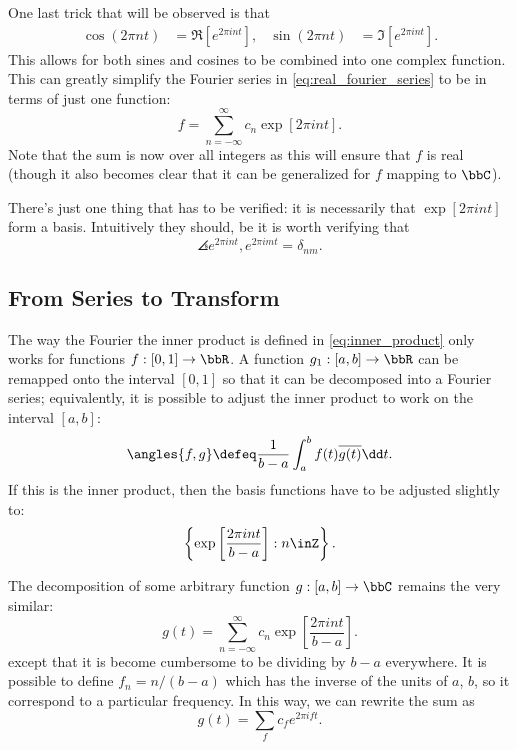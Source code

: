 \documentclass[
  a4paper,             %
  11pt,                %
  oneside,             %
  onecolumn,           %
  bibliography=totoc,  %
  final,               %
]{scrartcl}
\begin{document}
One last trick that will be observed is that
\begin{align}
  \cos(2\pi n t) &= \Re[e^{2\pi i n t}], &
  \sin(2\pi n t) &= \Im[e^{2\pi i n t}].
\end{align}
This allows for both sines and cosines to be combined into one complex function.
This can greatly simplify the Fourier series in \cref{eq:real_fourier_series}
to be in terms of just one function:
\begin{equation}
  \label{eq:complex_fourier_series}
  f = \sum_{n=-\infty}^{\infty} c_{n} \exp[2\pi i n t].
\end{equation}
Note that the sum is now over all integers as this will ensure that \(f\) is
real (though it also becomes clear that it can be generalized for \(f\) mapping
to \(\bbC\)).

There's just one thing that has to be verified: it is necessarily that \(\exp[2
\pi i n t]\) form a basis.  Intuitively they should, be it is worth verifying
that
\begin{equation}
  \angles{e^{2\pi i n t}, e^{2\pi i m t}} = \delta_{nm}.
\end{equation}

\subsection{From Series to Transform}
\label{subsec:from_series_to_transform}

The way the Fourier the inner product is defined in \cref{eq:inner_product} only
works for functions \(f : [0, 1] \to \bbR\).  A function \(g_{1} : [a, b] \to
\bbR\) can be remapped onto the interval \([0, 1]\) so that it can be decomposed
into a Fourier series; equivalently, it is possible to adjust the inner product
to work on the interval \([a, b]\):
\begin{equation}
  \label{eq:new_inner_product}
  \angles{f, g} \defeq \frac{1}{b-a} \int_{a}^{b} f(t) \overline{g(t)} \dd t.
\end{equation}
If this is the inner product, then the basis functions have to be adjusted
slightly to:
\begin{equation}
  \label{eq:new_basis}
  \left\{ \exp\left[ \frac{2\pi i n t}{b - a} \right] : n \inZ \right\}.
\end{equation}

The decomposition of some arbitrary function \(g : [a, b] \to \bbC\) remains the
very similar:
\begin{equation}
  g(t) = \sum_{n=-\infty}^{\infty} c_{n} \exp\left[ \frac{2\pi i n t}{b - a} \right].
\end{equation}
except that it is become cumbersome to be dividing by \(b - a\) everywhere.  It
is possible to define \(f_{n} = n / (b - a)\) which has the inverse of the units
of \(a\), \(b\), so it correspond to a particular frequency.  In this way, we
can rewrite the sum as
\begin{equation}
  g(t) = \sum_{f} c_{f} e^{2\pi i f t}.
\end{equation}
\end{document}
